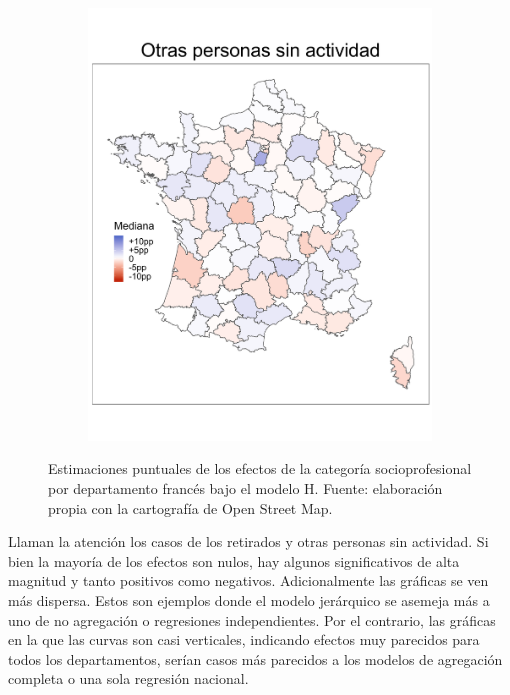 \begin{figure}
\begin{subfigure}{0.235\textwidth}
	\includegraphics[width = \textwidth]{Figs/Efectos/Mapa_Efectos_CSP8_Modelo_H}
	\end{subfigure}
	\caption{Estimaciones puntuales de los efectos de la categoría socioprofesional por departamento francés bajo el modelo H. Fuente: elaboración propia con la cartografía de Open Street Map.}
	\label{fig:Mapa_Efectos_Cat_Socioprof}
\end{figure}


Llaman la atención los casos de los retirados y otras personas sin actividad. Si bien la mayoría de los efectos son nulos, hay algunos significativos de alta magnitud y tanto positivos como negativos. Adicionalmente las gráficas se ven más dispersa. Estos son ejemplos donde el modelo jerárquico se asemeja más a uno de no agregación o regresiones independientes. Por el contrario, las gráficas en la que las curvas son casi verticales, indicando efectos muy parecidos para todos los departamentos, serían casos más parecidos a los modelos de agregación completa o una sola regresión nacional.\\ 

